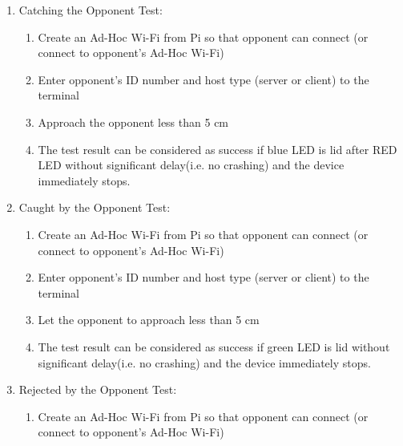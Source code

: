 \documentclass[a4paper,12pt]{article}
\begin{document}
\begin{enumerate}
	
	
	\item Catching the Opponent Test:
	
	
	\begin{enumerate}
		
		\item Create an Ad-Hoc Wi-Fi from Pi so that opponent can connect (or connect to opponent's Ad-Hoc Wi-Fi)
		
		\item Enter opponent's ID number and host type (server or client) to the terminal
		
		\item Approach the opponent less than 5 cm
		
		\item The test result can be considered as success if blue LED is lid  after RED LED without significant delay(i.e. no crashing) and the device immediately stops.
		
	\end{enumerate}		
	
	
	\item Caught by the Opponent Test:
	
	
	\begin{enumerate}
		
		\item Create an Ad-Hoc Wi-Fi from Pi so that opponent can connect (or connect to opponent's Ad-Hoc Wi-Fi)
		
		\item Enter opponent's ID number and host type (server or client) to the terminal
		
		\item Let the opponent to approach less than 5 cm
		
		\item The test result can be considered as success if green LED is lid without significant delay(i.e. no crashing) and the device immediately stops.
		
	\end{enumerate}	
	
	\item Rejected by the Opponent Test:
	
	
	\begin{enumerate}
		
		\item Create an Ad-Hoc Wi-Fi from Pi so that opponent can connect (or connect to opponent's Ad-Hoc Wi-Fi)
		

\end{enumerate}
\end{enumerate}
\end{document}
